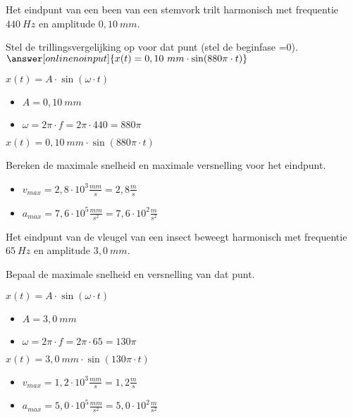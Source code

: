 \documentclass{ximera}
\begin{document}
\begin{exercise} 
    Het eindpunt van een been van een stemvork trilt harmonisch met frequentie $440 \ Hz$ en amplitude $0,10 \ mm$.
    \begin{question}
        Stel de trillingsvergelijking op voor dat punt (stel de beginfase =$0$).
        $\answer[onlinenoinput]{x(t)=0,10 \ mm \cdot \sin(880  \pi \cdot t)}$
        \begin{oplossing}
            $x(t)=A\cdot \sin(\omega \cdot t)$
            \begin{itemize}
                \item $A=0,10 \ mm$
                \item $\omega=2\pi \cdot f=2\pi \cdot 440=880 \pi$ 
            \end{itemize}
            $x(t)=0,10 \ mm \cdot \sin(880  \pi \cdot t)$
        \end{oplossing}
    \end{question}

    \begin{question}
        Bereken de maximale snelheid en maximale versnelling voor het eindpunt.
        \begin{oplossing}
            \begin{itemize}
            \item $v_{max}=2,8 \cdot 10^{3}  \frac{mm}{s}=2,8  \frac{m}{s}$
            \item $a_{max}=7,6 \cdot 10^{5}  \frac{mm}{s^2}=7,6\cdot 10^2  \frac{m}{s^2}$
            \end{itemize}
        \end{oplossing}
    \end{question}
\end{exercise}

\begin{exercise} 
    Het eindpunt van de vleugel van een insect beweegt harmonisch met frequentie $65 \ Hz$ en amplitude $3,0 \ mm$. 
    \begin{question}
    Bepaal de maximale snelheid en versnelling van dat punt.
    \begin{oplossing}
        $x(t)=A\cdot \sin(\omega \cdot t)$
            \begin{itemize}
                \item $A=3,0 \ mm$
                \item $\omega=2\pi \cdot f=2\pi \cdot 65=130 \pi$ 
            \end{itemize}
            $x(t)=3,0 \ mm \cdot \sin(130  \pi \cdot t)$
        \begin{itemize}
        \item $v_{max}=1,2 \cdot 10^{3}  \frac{mm}{s}=1,2  \frac{m}{s}$
        \item $a_{max}=5,0 \cdot 10^{5}  \frac{mm}{s^2}=5,0\cdot 10^2  \frac{m}{s^2}$
        \end{itemize}
    \end{oplossing}
    \end{question}


\end{exercise}
\end{document}
